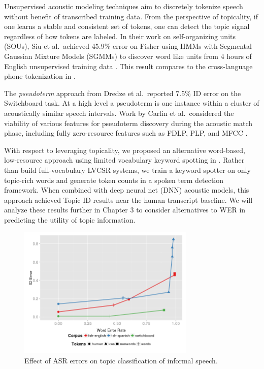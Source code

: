 Unsupervised acoustic modeling techniques aim to discretely tokenize speech without benefit of transcribed training data.  From the perspective of topicality, if one learns a stable and consistent set of tokens, one can detect the topic signal regardless of how tokens are labeled.  In their work on self-organizing units (SOUs), Siu et al.\ achieved 45.9\% error on Fisher using HMMs with Segmental Gaussian Mixture Models (SGMMs) to discover word like units from 4 hours of English unsupervised training data \cite{siu2013}.  This result compares to the cross-language phone tokenization in \cite{hazen2008}.   

The \textit{pseudoterm} approach from Dredze et al.\ reported 7.5\% ID error on the Switchboard task\cite{dredze2010}.  At a high level a pseudoterm is one instance within a cluster of acoustically similar speech intervals.  Work by Carlin et al.\ considered the viability of various features for pseudoterm discovery during the acoustic match phase, including fully zero-resource features such as FDLP, PLP, and MFCC \cite{carlin2011}.

With respect to leveraging topicality, we proposed an alternative word-based, low-resource approach using limited vocabulary keyword spotting in \cite{wintrode2014}.  Rather than build full-vocabulary LVCSR systems, we train a keyword spotter on only topic-rich words and generate token counts in a spoken term detection framework.  When combined with deep neural net (DNN) acoustic models, this approach achieved Topic ID results near the human transcript baseline.  We will analyze these results further in Chapter 3 to consider alternatives to WER in predicting the utility of topic information.



\begin{figure}[t]
\centering
\includegraphics[width=0.75\textwidth]{graphs/wer-err.png}
\caption[Effects of ASR errors on Topic ID]{\label{baseline1}Effect of ASR errors on topic classification of informal speech.}
\end{figure}

